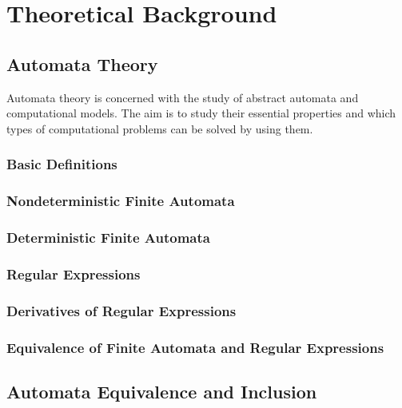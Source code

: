 \chapter{Theoretical Background}

\section{Automata Theory}

    Automata theory is concerned with the study of abstract automata and computational models.
    The aim is to study their essential properties and which types of computational problems can be solved by using them.

    \subsection{Basic Definitions}
    

    \subsection{Nondeterministic Finite Automata}
    

    \subsection{Deterministic Finite Automata}
    

    \subsection{Regular Expressions}
    

    \subsection{Derivatives of Regular Expressions}
    

    \subsection{Equivalence of Finite Automata and Regular Expressions}

\section{Automata Equivalence and Inclusion}

